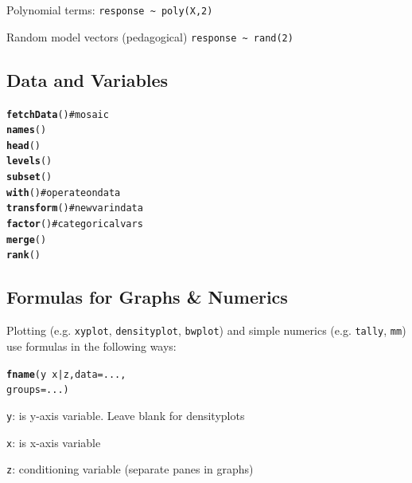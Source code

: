 \documentclass{report}\usepackage{graphicx, color}
\makeatletter
\newcommand{\hlfunctioncall}[1]{\textcolor[rgb]{0.501960784313725,0,0.329411764705882}{\textbf{#1}}}%
\newcommand{\hlcomment}[1]{\textcolor[rgb]{0.180392156862745,0.6,0.341176470588235}{#1}}%
\newenvironment{kframe}{%
 \def\at@end@of@kframe{}%
 \ifinner\ifhmode%
  \def\at@end@of@kframe{\end{minipage}}%
  \begin{minipage}{\columnwidth}%
 \fi\fi%
 \def\FrameCommand##1{\hskip\@totalleftmargin \hskip-\fboxsep
 \colorbox{shadecolor}{##1}\hskip-\fboxsep
     \hskip-\linewidth \hskip-\@totalleftmargin \hskip\columnwidth}%
 \MakeFramed {\advance\hsize-\width
   \@totalleftmargin\z@ \linewidth\hsize
   \@setminipage}}%
 {\par\unskip\endMakeFramed%
 \at@end@of@kframe}
\newenvironment{knitrout}{}{} %
\makeatother
\begin{document}
\begin{multicols}{4}
\medskip

Polynomial terms:
\verb=response ~ poly(X,2)=

\medskip

Random model vectors (pedagogical)
\verb=response ~ rand(2)= 

\subsection*{Data and Variables}
\begin{knitrout}
\color{fgcolor}\begin{kframe}
\begin{alltt}
\hlfunctioncall{fetchData}() \hlcomment{# mosaic}
\hlfunctioncall{names}()
\hlfunctioncall{head}()
\hlfunctioncall{levels}()
\hlfunctioncall{subset}()
\hlfunctioncall{with}()      \hlcomment{# operate on data}
\hlfunctioncall{transform}() \hlcomment{# new var in data }
\hlfunctioncall{factor}()    \hlcomment{# categorical vars}
\hlfunctioncall{merge}()
\hlfunctioncall{rank}()
\end{alltt}
\end{kframe}
\end{knitrout}




\vfill

\columnbreak


\subsection*{Formulas for Graphs \& Numerics}
Plotting (e.g. \texttt{xyplot}, \texttt{densityplot}, \texttt{bwplot}) and simple numerics (e.g. \texttt{tally}, \texttt{mm}) use formulas in the following ways:

\begin{knitrout}
\color{fgcolor}\begin{kframe}
\begin{alltt}
\hlfunctioncall{fname}( y ~ x | z, data=..., 
                  groups=... )
\end{alltt}
\end{kframe}
\end{knitrout}

\noindent \texttt{y}: is y-axis variable.  Leave blank for densityplots 

\noindent \texttt{x}: is x-axis variable
  
\noindent \texttt{z}: conditioning variable (separate panes in graphs)
	

\end{multicols}
\end{document}
